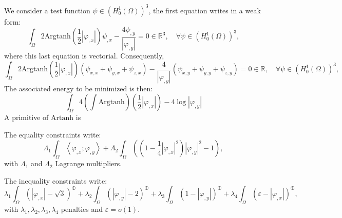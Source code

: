We consider a test function $\psi \in \left(H^1_0(\Omega) \right)^3$, the first equation writes in a weak form:
\begin{equation}
\label{eq:weak form}
\int_{\Omega} 2\mathrm{Argtanh}(\frac12 |\varphi_{,x}|)\psi_{,x} - \frac{4\psi_{,y}}{|\varphi_{,y}|} = 0 \in \mathbb{R}^3, \quad \forall \psi \in \left(H^1_0(\Omega) \right)^3,
\end{equation}
where this last equation is vectorial.
Consequently,
\begin{equation}
\label{eq:weak form 2}
\int_{\Omega} 2\mathrm{Argtanh}(\frac12 |\varphi_{,x}|)(\psi_{x,x} + \psi_{y,x} + \psi_{z,x}) - \frac{4}{|\varphi_{,y}|} (\psi_{x,y} + \psi_{y,y} + \psi_{z,y}) = 0 \in \mathbb{R}, \quad \forall \psi \in \left(H^1_0(\Omega) \right)^3,
\end{equation}
The associated energy to be minimized is then:
\begin{equation}
\label{eq:energy}
\int_{\Omega} 4\left( \int \mathrm{Argtanh} \right)(\frac12 |\varphi_{,x}|)- 4 \log |\varphi_{,y}| 
\end{equation}
A primitive of $\mathrm{Artanh}$ is 

The equality constraints write:
\begin{equation}
\Lambda_1 \int_{\Omega} \left\langle \varphi_{,x} ; \varphi_{,y} \right\rangle + \Lambda_2 \int_{\Omega} \left( (1 - \frac14 |\varphi_{,x}|^2) |\varphi_{,y}|^2 - 1 \right),
\end{equation}
with $\Lambda_1$ and $\Lambda_2$ Lagrange multipliers.

The inequality constraints write:
\begin{equation}
\label{eq:inequality constraints energy}
\lambda_1 \int_{\Omega} \left(|\varphi_{,x}| - \sqrt{3} \right)^\oplus + \lambda_2 \int_{\Omega} \left(|\varphi_{,y}| - 2 \right)^\oplus + \lambda_3 \int_{\Omega} \left(1 - |\varphi_{,y}| \right)^\oplus + \lambda_4 \int_{\Omega} \left(\varepsilon - |\varphi_{,x}| \right)^\oplus,
\end{equation}
with $\lambda_1,\lambda_2,\lambda_3,\lambda_4$ penalties  and $\varepsilon = o(1)$.







